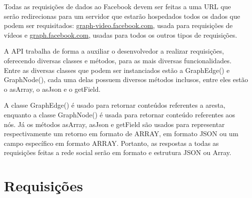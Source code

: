 Todas as requisições de dados ao Facebook devem ser feitas a uma URL que serão redirecionas para um servidor que estarão hospedados todos os dados que podem ser requisitados: \url{graph-video.facebook.com}, usada para requisições de vídeos e \url{graph.facebook.com}, usadas para todos os outros tipos de requisições.

A API trabalha de forma a auxiliar o desenvolvedor a realizar requisições, oferecendo diversas classes e métodos, para as mais diversas funcionalidades. Entre as diversas classes que podem ser instanciados estão a GraphEdge() e GraphNode(), cada uma delas possuem diversos métodos inclusos, entre eles estão o asArray, o asJson e o getField.

A classe GraphEdge() é usado para retornar conteúdos referentes a aresta, enquanto a classe GraphNode() é usada para retornar conteúdo referentes aos nós. Já os métodos asArray, asJson e getField são usados para representar respectivamente um retorno em formato de ARRAY, em formato JSON ou um campo específico em formato ARRAY. Portanto, as respostas a todas as requisições feitas a rede social serão em formato e estrutura JSON ou Array.

\section{Requisições}

